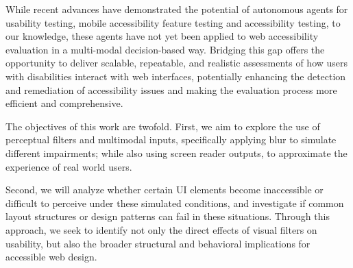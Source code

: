 While recent advances have demonstrated the potential of autonomous agents for usability testing\cite{lu2025uxagent}, mobile accessibility feature testing\cite{taeb2024axnav} and accessibility testing\cite{zhong2025screenaudit}, to our knowledge, these agents have not yet been applied to web accessibility evaluation in a multi-modal decision-based way. Bridging this gap offers the opportunity to deliver scalable, repeatable, and realistic assessments of how users with disabilities interact with web interfaces, potentially enhancing the detection and remediation of accessibility issues and making the evaluation process more efficient and comprehensive.


The objectives of this work are twofold. First, we aim to explore the use of perceptual filters and multimodal inputs, specifically applying blur to simulate different impairments; while also using screen reader outputs, to approximate the experience of real world users. 

Second, we will analyze whether certain \ac{UI} elements become inaccessible or difficult to perceive under these simulated conditions, and investigate if common layout structures or design patterns can fail in these situations. Through this approach, we seek to identify not only the direct effects of visual filters on usability, but also the broader structural and behavioral implications for accessible web design. 

